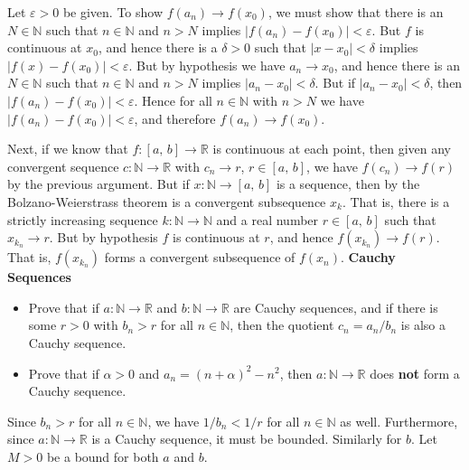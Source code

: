 \documentclass{article}
\begin{document}
    \color{blue}
    Let $\varepsilon>0$ be given. To show $f(a_{n})\rightarrow{f}(x_{0})$, we
    must show that there is an $N\in\mathbb{N}$ such that $n\in\mathbb{N}$ and
    $n>N$ implies $|f(a_{n})-f(x_{0})|<\varepsilon$. But $f$ is continuous
    at $x_{0}$, and hence there is a $\delta>0$ such that
    $|x-x_{0}|<\delta$ implies $|f(x)-f(x_{0})|<\varepsilon$. But by hypothesis
    we have $a_{n}\rightarrow{x}_{0}$, and hence there is an $N\in\mathbb{N}$
    such that $n\in\mathbb{N}$ and $n>N$ implies
    $|a_{n}-x_{0}|<\delta$. But if $|a_{n}-x_{0}|<\delta$, then
    $|f(a_{n})-f(x_{0})|<\varepsilon$. Hence for all $n\in\mathbb{N}$ with
    $n>N$ we have $|f(a_{n})-f(x_{0})|<\varepsilon$, and therefore
    $f(a_{n})\rightarrow{f}(x_{0})$.
    \par\hfill\par
    Next, if we know that $f:[a,\,b]\rightarrow\mathbb{R}$ is continuous
    at each point, then given any convergent sequence
    $c:\mathbb{N}\rightarrow\mathbb{R}$ with $c_{n}\rightarrow{r}$,
    $r\in[a,\,b]$, we have $f(c_{n})\rightarrow{f}(r)$ by the previous
    argument. But if $x:\mathbb{N}\rightarrow[a,\,b]$ is a sequence, then by
    the Bolzano-Weierstrass theorem is a convergent subsequence $x_{k}$.
    That is, there is a strictly increasing sequence
    $k:\mathbb{N}\rightarrow\mathbb{N}$ and a real number $r\in[a,\,b]$
    such that $x_{k_{n}}\rightarrow{r}$. But by hypothesis $f$ is continuous
    at $r$, and hence $f(x_{k_{n}})\rightarrow{f}(r)$. That is,
    $f(x_{k_{n}})$ forms a convergent subsequence of $f(x_{n})$.
    \color{black}
    \newpage
    \textbf{Cauchy Sequences}
    \begin{itemize}
        \item
            Prove that if $a:\mathbb{N}\rightarrow\mathbb{R}$ and
            $b:\mathbb{N}\rightarrow\mathbb{R}$ are Cauchy sequences, and if
            there is some $r>0$ with $b_{n}>r$ for all $n\in\mathbb{N}$,
            then the quotient $c_{n}=a_{n}/b_{n}$ is also a Cauchy sequence.
        \item
            Prove that if $\alpha>0$ and $a_{n}=(n+\alpha)^{2}-n^{2}$, then
            $a:\mathbb{N}\rightarrow\mathbb{R}$ does \textbf{not} form a
            Cauchy sequence.
    \end{itemize}
    \color{blue}
    Since $b_{n}>r$ for all $n\in\mathbb{N}$, we have
    $1/b_{n}<1/r$ for all $n\in\mathbb{N}$ as well. Furthermore, since
    $a:\mathbb{N}\rightarrow\mathbb{R}$ is a Cauchy sequence, it must be
    bounded. Similarly for $b$. Let $M>0$ be a bound for both $a$ and $b$.
\end{document}
